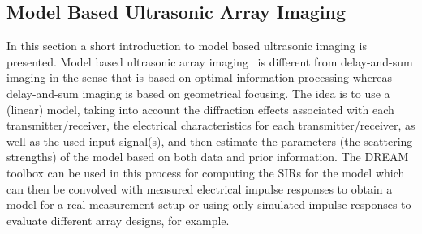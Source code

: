 \subsection{Model Based Ultrasonic  Array Imaging}

In this section a short introduction to model based ultrasonic imaging is presented. Model based ultrasonic array
imaging~\cite{Stoughton1993,Lingvall2003,Lingvall2007} is different from delay-and-sum imaging in the sense that is
based on optimal information processing  whereas delay-and-sum imaging is based on geometrical focusing. The idea is
to use a (linear) model, taking into account the diffraction effects associated with each transmitter/receiver, the
electrical characteristics for each transmitter/receiver, as well as the used input signal(s), and
then estimate the parameters (the scattering strengths) of the model based on both data and prior
information.
%
The DREAM toolbox can be used in this process for computing the SIRs for the model which can then be convolved
with measured electrical impulse responses to obtain a model for a real measurement setup or using only simulated
impulse responses to evaluate different array designs, for example.

